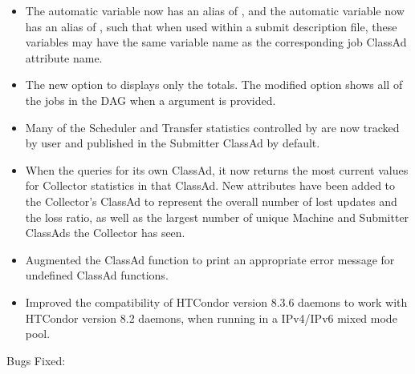 \begin{itemize}
\item The automatic variable  now has an alias of ,
and the automatic variable  now has an alias 
of ,
such that when used within a submit description file,
these variables may have the same variable name as the corresponding
job ClassAd attribute name.

\item The new  option to  displays only the totals.
The modified  option 
shows all of the jobs in the DAG when a  argument is provided.

\item Many of the Scheduler and Transfer statistics controlled by 
are now tracked by user and published in the Submitter ClassAd by default.

\item When the  queries for its own ClassAd, 
it now returns the most current values for Collector statistics in that ClassAd.
New attributes have been added to the Collector's ClassAd
to represent the overall number of lost updates and the loss ratio,
 as well as the largest number of unique Machine
and Submitter ClassAds the Collector has seen.

\item Augmented the ClassAd function  
to print an appropriate error message for undefined ClassAd functions.

\item Improved the compatibility of HTCondor version 8.3.6 daemons to work
with HTCondor version 8.2 daemons,
when running in a IPv4/IPv6 mixed mode pool.

\end{itemize}

\noindent Bugs Fixed:


